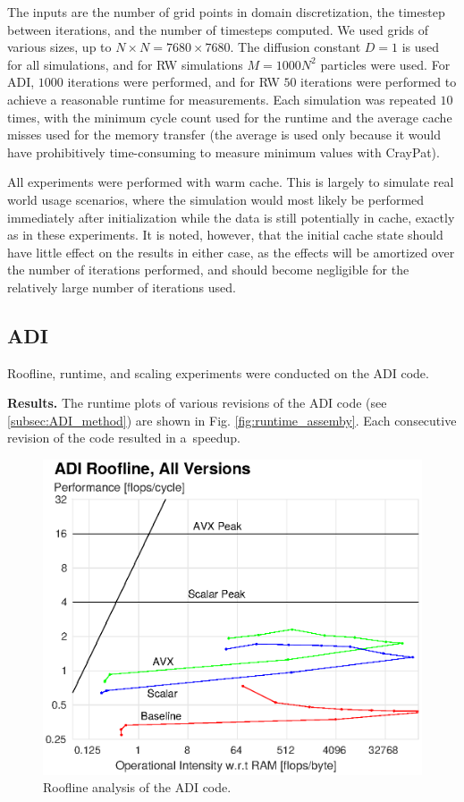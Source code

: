 \documentclass[letterpaper]{article}
\newcommand{\mypar}[1]{{\bf #1.}}
\begin{document}
The inputs are the number of grid points in domain discretization, the timestep between iterations, and the number of timesteps computed. We used grids of various sizes, up to $N\times N=7680\times7680$. The diffusion constant $D=1$ is used for all simulations, and for RW simulations $M=1000N^2$ particles were used. For ADI, $1000$ iterations were performed, and for RW $50$ iterations were performed to achieve a reasonable runtime for measurements. Each simulation was repeated $10$ times, with the minimum cycle count used for the runtime and the average cache misses used for the memory transfer (the average is used only because it would have prohibitively time-consuming to measure minimum values with CrayPat).

All experiments were performed with warm cache. This is largely to simulate real world usage scenarios, where the simulation would most likely be performed immediately after initialization while the data is still potentially in cache, exactly as in these experiments. It is noted, however, that the initial cache state should have little effect on the results in either case, as the effects will be amortized over the number of iterations performed, and should become negligible for the relatively large number of iterations used.

\subsection{ADI}\label{subsec:ADI_results}
Roofline, runtime, and scaling experiments were conducted on the ADI code.

\mypar{Results}
The runtime plots of various revisions of the ADI code (see \ref{subsec:ADI_method}) are shown in Fig. \ref{fig:runtime_assemby}. Each consecutive revision of the code resulted in a~speedup.

\begin{figure}\centering
  \includegraphics[width=\linewidth]{./plots/roofline_ADI_all_cropped.eps}
  \caption{Roofline analysis of the ADI code.}
  \label{fig:roofline_ADI_all}
\end{figure}
\end{document}
